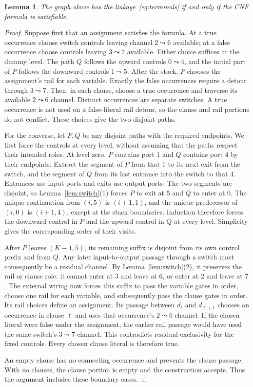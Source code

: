 \documentclass[11pt,a4paper]{article}
\newtheorem{lemma}[theorem]{Lemma}
\begin{document}
\begin{lemma}\label{lem:sat}
The graph above has the linkage~\eqref{eq:terminals} if and only if the
CNF formula is satisfiable.
\end{lemma}
\begin{proof}
Suppose first that an assignment satisfies the formula. At a true
occurrence choose switch controls leaving channel $2\leadsto6$ available;
at a false occurrence choose controls leaving $3\leadsto7$ available.
Either choice suffices at the dummy level. The path $Q$ follows the upward
controls $0\leadsto4$, and the initial part of $P$ follows the downward
controls $1\leadsto5$. After the stack, $P$ chooses the assignment's rail
for each variable. Exactly the false occurrences require a detour through
$3\leadsto7$. Then, in each clause, choose a true occurrence and traverse
its available $2\leadsto6$ channel. Distinct occurrences are separate
switches. A true occurrence is not used on a false-literal rail detour,
so the clause and rail portions do not conflict. These choices give the
two disjoint paths.

For the converse, let $P,Q$ be any disjoint paths with the required
endpoints. We first force the controls at every level, without assuming
that the paths respect their intended roles. At level zero, $P$ contains
port $1$ and $Q$ contains port $4$ by their endpoints. Extract the segment
of $P$ from that $1$ to its next exit from the switch, and the segment of
$Q$ from its last entrance into the switch to that $4$. Entrances use input
ports and exits use output ports. The two segments are disjoint, so
Lemma~\ref{lem:switch}(1) forces $P$ to exit at $5$ and $Q$ to enter at $0$.
The unique continuation from $(i,5)$ is $(i+1,1)$, and the unique predecessor
of $(i,0)$ is $(i+1,4)$, except at the stack boundaries.
Induction therefore forces the downward control in $P$ and the upward
control in $Q$ at every level. Simplicity gives the corresponding order
of their visits.

After $P$ leaves $(K-1,5)$, its remaining suffix is disjoint from its own
control prefix and from $Q$. Any later input-to-output passage through a
switch must consequently be a residual channel. By
Lemma~\ref{lem:switch}(2), it preserves the rail or clause role: it cannot
enter at $3$ and leave at $6$, or enter at $2$ and leave at $7$.
The external wiring now forces this suffix to pass the variable gates in
order, choose one rail for each variable, and subsequently pass the clause
gates in order. Its rail choices define an assignment. Its passage between
$d_\ell$ and $d_{\ell+1}$ chooses an occurrence in clause $\ell$ and uses
that occurrence's $2\leadsto6$ channel. If the chosen literal were false
under the assignment, the earlier rail passage would have used the same
switch's $3\leadsto7$ channel. This contradicts residual exclusivity for
the fixed controls. Every chosen clause literal is therefore true.

An empty clause has no connecting occurrence and prevents the clause
passage. With no clauses, the clause portion is empty and the construction
accepts. Thus the argument includes these boundary cases.
\end{proof}
\end{document}
